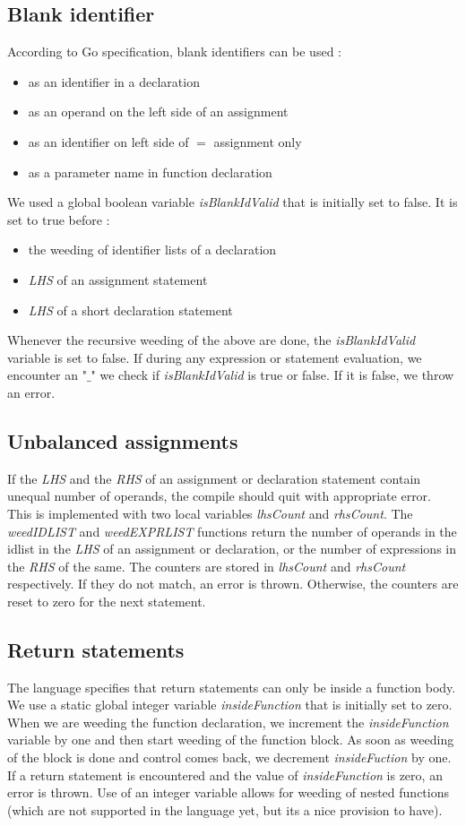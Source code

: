 \documentclass[a4paper]{article}
\begin{document}
\subsection{Blank identifier}
According to Go specification, blank identifiers can be used :
\begin{itemize}
\item as an identifier in a declaration
\item as an operand on the left side of an assignment
\item as an identifier on left side of $=$ assignment only
\item as a parameter name in function declaration
\end{itemize}
We used a global boolean variable \textit{isBlankIdValid} that is initially set to false. It is set to true before :
\begin{itemize}
\item the weeding of identifier lists of a declaration
\item \textit{LHS} of an assignment statement
\item \textit{LHS} of a short declaration statement
\end{itemize} 
Whenever the recursive weeding of the above are done, the \textit{isBlankIdValid } variable is set to false. If during any expression or statement evaluation, we encounter an "$\_$" we check if \textit{isBlankIdValid} is true or false. If it is false, we throw an error.

\subsection{Unbalanced assignments}
If the \textit{LHS} and the \textit{RHS} of an assignment or declaration statement contain unequal number of operands, the compile should quit with appropriate error. This is implemented with two local variables \textit{lhsCount} and \textit{rhsCount}. The \textit{weedIDLIST} and \textit{weedEXPRLIST} functions return the number of operands in the idlist in the \textit{LHS} of an assignment or declaration, or the number of expressions in the \textit{RHS} of the same. The counters are stored in \textit{lhsCount} and \textit{rhsCount} respectively. If they do not match, an error is thrown. Otherwise, the counters are reset to zero for the next statement.

\subsection{Return statements}
The language specifies that return statements can only be inside a function body. We use a static global integer variable \textit{insideFunction} that is initially set to zero. When we are weeding the function declaration, we increment the \textit{insideFunction} variable by one and then start weeding of the function block. As soon as weeding of the block is done and control comes back, we decrement \textit{insideFuction} by one. If a return statement is encountered and the value of \textit{insideFunction} is zero, an error is thrown. Use of an integer variable allows for weeding of nested functions (which are not supported in the language yet, but its a nice provision to have).
\end{document}
